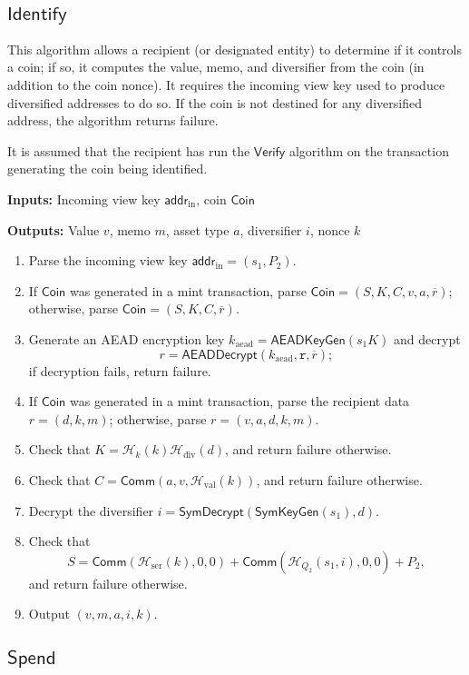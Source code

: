 \documentclass{article}
\newcommand{\func}[1]{\mathsf{#1}}
\newcommand{\addr}{\func{addr}}
\newcommand{\comm}{\func{Comm}}
\newcommand{\hash}{\mathcal{H}}
\begin{document}
\subsection{\texorpdfstring{$\func{Identify}$}{Identify}}

This algorithm allows a recipient (or designated entity) to determine if it controls a coin; if so, it computes the value, memo, and diversifier from the coin (in addition to the coin nonce).
It requires the incoming view key used to produce diversified addresses to do so.
If the coin is not destined for any diversified address, the algorithm returns failure.

It is assumed that the recipient has run the $\func{Verify}$ algorithm on the transaction generating the coin being identified.

\textbf{Inputs:} Incoming view key $\addr_{\text{in}}$, coin $\func{Coin}$

\textbf{Outputs:} Value $v$, memo $m$, asset type $a$, diversifier $i$, nonce $k$

\begin{enumerate}
\item Parse the incoming view key $\addr_{\text{in}} = (s_1, P_2)$.
\item If $\func{Coin}$ was generated in a mint transaction, parse $\func{Coin} = (S, K, C, v, a, \overline{r})$; otherwise, parse $\func{Coin} = (S, K, C, \overline{r})$.
\item Generate an AEAD encryption key $k_{\text{aead}} = \func{AEADKeyGen}(s_1 K)$ and decrypt $$r = \func{AEADDecrypt}(k_{\text{aead}},\texttt{r},\overline{r});$$ if decryption fails, return failure.
\item If $\func{Coin}$ was generated in a mint transaction, parse the recipient data $r = (d, k, m)$; otherwise, parse $r = (v, a, d, k, m)$.
\item Check that $K = \hash_k(k)\hash_{\text{div}}(d)$, and return failure otherwise.
\item Check that $C = \comm(a,v,\hash_{\text{val}}(k))$, and return failure otherwise.
\item Decrypt the diversifier $i = \func{SymDecrypt}(\func{SymKeyGen}(s_1),d)$.
\item Check that $$S = \comm(\hash_{\text{ser}}(k),0,0) + \comm(\hash_{Q_2}(s_1,i),0,0) + P_2,$$ and return failure otherwise.
\item Output $(v, m, a, i, k)$.
\end{enumerate}


\subsection{\texorpdfstring{$\func{Spend}$}{Spend}}
\end{document}
